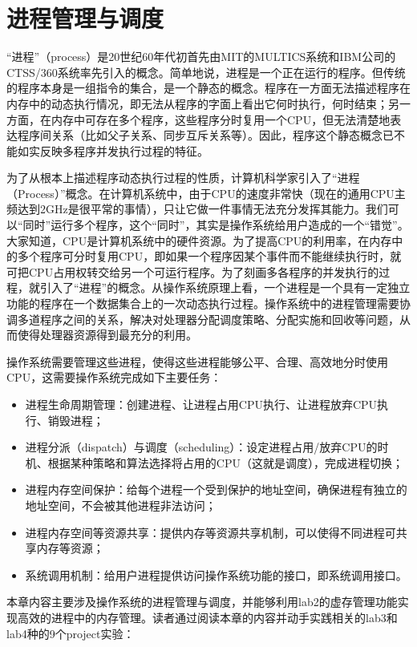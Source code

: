\section{进程管理与调度}\label{ux8fdbux7a0bux7ba1ux7406ux4e0eux8c03ux5ea6}

``进程''（process）是20世纪60年代初首先由MIT的MULTICS系统和IBM公司的CTSS/360系统率先引入的概念。简单地说，进程是一个正在运行的程序。但传统的程序本身是一组指令的集合，是一个静态的概念。程序在一方面无法描述程序在内存中的动态执行情况，即无法从程序的字面上看出它何时执行，何时结束；另一方面，在内存中可存在多个程序，这些程序分时复用一个CPU，但无法清楚地表达程序间关系（比如父子关系、同步互斥关系等）。因此，程序这个静态概念已不能如实反映多程序并发执行过程的特征。

为了从根本上描述程序动态执行过程的性质，计算机科学家引入了``进程（Process）''概念。在计算机系统中，由于CPU的速度非常快（现在的通用CPU主频达到2GHz是很平常的事情），只让它做一件事情无法充分发挥其能力。我们可以``同时''运行多个程序，这个``同时''，其实是操作系统给用户造成的一个``错觉''。大家知道，CPU是计算机系统中的硬件资源。为了提高CPU的利用率，在内存中的多个程序可分时复用CPU，即如果一个程序因某个事件而不能继续执行时，就可把CPU占用权转交给另一个可运行程序。为了刻画多各程序的并发执行的过程，就引入了``进程''的概念。从操作系统原理上看，一个进程是一个具有一定独立功能的程序在一个数据集合上的一次动态执行过程。操作系统中的进程管理需要协调多道程序之间的关系，解决对处理器分配调度策略、分配实施和回收等问题，从而使得处理器资源得到最充分的利用。

操作系统需要管理这些进程，使得这些进程能够公平、合理、高效地分时使用CPU，这需要操作系统完成如下主要任务：

\begin{itemize}
\item
  进程生命周期管理：创建进程、让进程占用CPU执行、让进程放弃CPU执行、销毁进程；
\item
  进程分派（dispatch）与调度（scheduling）：设定进程占用/放弃CPU的时机、根据某种策略和算法选择将占用的CPU（这就是调度），完成进程切换；
\item
  进程内存空间保护：给每个进程一个受到保护的地址空间，确保进程有独立的地址空间，不会被其他进程非法访问；
\item
  进程内存空间等资源共享：提供内存等资源共享机制，可以使得不同进程可共享内存等资源；
\item
  系统调用机制：给用户进程提供访问操作系统功能的接口，即系统调用接口。
\end{itemize}

本章内容主要涉及操作系统的进程管理与调度，并能够利用lab2的虚存管理功能实现高效的进程中的内存管理。读者通过阅读本章的内容并动手实践相关的lab3和lab4种的9个project实验：

